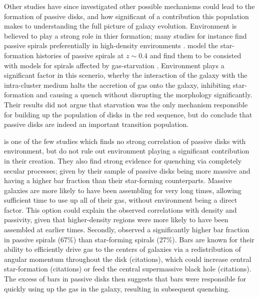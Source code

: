 \documentclass[useAMS,usenatbib]{mn2e}
\begin{document}
Other studies have since investigated other possible mechanisms could lead to the formation of passive disks, and how significant of a contribution this population makes to understanding the full picture of galaxy evolution. Environment is believed to play a strong role in thier formation; many studies for instance find passive spirals preferentially in high-density environments \citep{Dressler1999, Poggianti1999, Goto2003, Deng2009, Hughes2009}. \citet{Moran2006} model the star-formation histories of passive spirals at $z\sim0.4$ and find them to be consisted with models for spirals affected by gas-starvation \citep{Larson1980, Quilis2000, Bekki2002}. Environment plays a significant factor in this scenerio, wherby the interaction of the galaxy with the intra-cluster medium halts the accretion of gas onto the galaxy, inhibiting star-formation and causing a quench without disrupting the morphology significantly. Their results did not argue that starvation was the only mechanism responsible for building up the population of disks in the red sequence, but do conclude that passive disks are indeed an important transition population.

\citet{Masters2010} is one of the few studies which finds no strong correlation of passive disks with environment, but do not rule out environment playing a significant contribution in their creation. They also find strong evidence for quenching via completely secular processes; given by their sample of passive disks being more massive and having a higher bar fraction than their star-forming counterparts. Massive galaxies are more likely to have been assembling for very long times, allowing sufficient time to use up all of their gas, without environment being a direct factor. This option could explain the observed correlations with density and passivity, given that higher-density regions were more likely to have been assembled at earlier times. Secondly, \citet{Masters2010} observed a significantly higher bar fraction in passive spirals (67\%) than star-forming spirals (27\%). Bars are known for their ability to efficiently drive gas to the centers of galaxies via a redistribution of angular momentum throughout the disk (citations), which could increase central star-formation (citations) or feed the central supermassive black hole (citations). The excess of bars in passive disks then suggests that bars were responsible for quickly using up the gas in the galaxy, resulting in subsequent quenching. 
\end{document}
